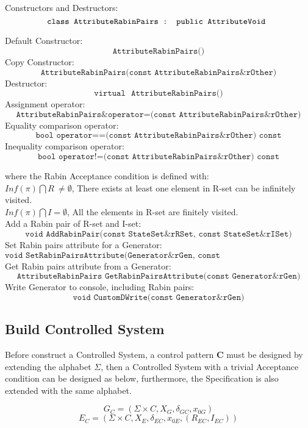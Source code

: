 \documentclass[
a4paper, 
12pt,
]{article}
\begin{document}
    Constructors and Destructors:
\[
\texttt{class AttributeRabinPairs : public AttributeVoid } \\
\]

Default Constructor:
\[
    \texttt{AttributeRabinPairs()}
\]
Copy Constructor:
\[
    \texttt{AttributeRabinPairs(const AttributeRabinPairs\& rOther)}
\]
Destructor:
\[
    \texttt{virtual ~AttributeRabinPairs()}
\]
Assignment operator:
\[
    \texttt{AttributeRabinPairs\& operator=(const AttributeRabinPairs\& rOther)}
\]
Equality comparison operator:
\[
    \texttt{bool operator==(const AttributeRabinPairs\& rOther) const}
\]
Inequality comparison operator:
\[
    \texttt{bool operator!=(const AttributeRabinPairs\& rOther) const}
\]
    
where the Rabin Acceptance condition is defined with: \\
$Inf(\pi)\bigcap R \ \neq \emptyset$, There exists at least one element in R-set can be infinitely visited.\\
$Inf(\pi)\bigcap I=\emptyset$, All the elements in R-set are finitely visited.\\

Add a Rabin pair of R-set and I-set:
\[
    \texttt{void AddRabinPair(const StateSet\& rRSet, const StateSet\& rISet)}
\]
Set Rabin pairs attribute for a Generator:
\[
    \texttt{void SetRabinPairsAttribute(Generator\& rGen, const AttributeRabinPairs\& rAttr)}
\]
Get Rabin pairs attribute from a Generator:
\[
    \texttt{AttributeRabinPairs GetRabinPairsAttribute(const Generator\& rGen)}
\]
Write Generator to console, including Rabin pairs:
\[
    \texttt{void CustomDWrite(const Generator\& rGen)}
\]


\subsection{Build Controlled System}
Before construct a Controlled System, a control pattern $\mathbf{C}$ must be designed by extending the alphabet $\varSigma $, then a Controlled System with a trivial Acceptance condition can be designed as below, furthermore, the Specification is also extended with the same alphabet.

\begin{equation}
    G_C=(\Sigma\times C, X_G, \delta _{GC} , x_{0G}) 
\end{equation}
\begin{equation}
    E_C=(\Sigma\times C, X_E, \delta _{EC} , x_{0E},(R_{EC},I_{EC})) 
\end{equation}
\end{document}
